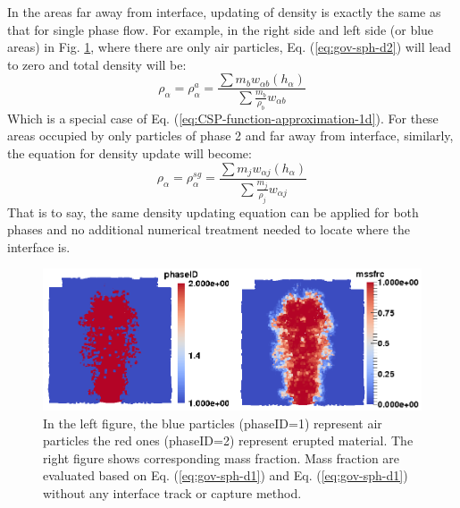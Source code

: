 \documentclass[journal abbreviation, manuscript]{copernicus}
\begin{document}
In the areas far away from interface, updating of density is exactly the same as that for single phase flow. For example, in the right side and left side (or blue areas) in Fig. \ref{fig:SPH-multiple-density}, where there are only air particles, Eq.  (\ref{eq:gov-sph-d2}) will lead to zero and total density will be:
\begin{equation}
\rho_{\alpha}=\rho_{\alpha}^a=\frac{\sum m_b w_{\alpha b} (h_{\alpha})}{\sum \frac{m_b}{\rho_b} w_{\alpha b}}
\end{equation}
Which is a special case of Eq. (\ref{eq:CSP-function-approximation-1d}). For these areas occupied by only particles of phase 2 and far away from interface, similarly, the equation for density update will become: 
\begin{equation}
\rho_{\alpha}=\rho_{\alpha}^{sg}=\frac{\sum m_j w_{\alpha j} (h_{\alpha})}{\sum \frac{m_j}{\rho_j} w_{\alpha j}}
\end{equation}
That is to say, the same density updating equation can be applied for both phases and no additional numerical treatment needed to locate where the interface is.
\begin{figure}
\includegraphics[width=12cm]{Interface.png}
\caption{In the left figure, the blue particles (phaseID=1) represent air particles the red ones (phaseID=2) represent erupted material. The right figure shows corresponding mass fraction. Mass fraction are evaluated based on Eq. (\ref{eq:gov-sph-d1}) and Eq. (\ref{eq:gov-sph-d1}) without any interface track or capture method.}
\label{fig:SPH-multiple-density}
\end{figure}
\end{document}
